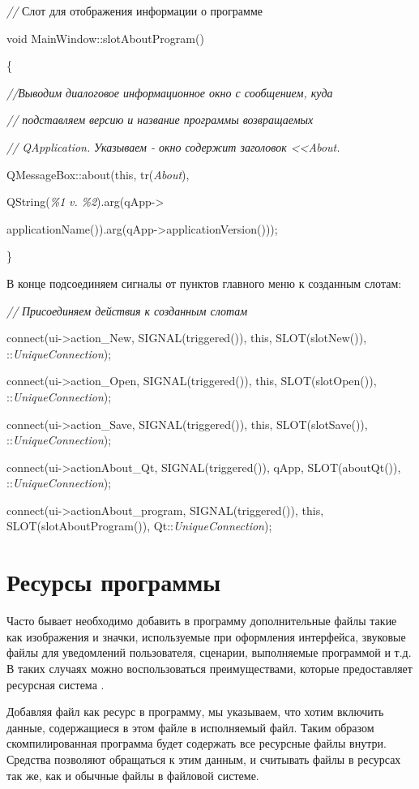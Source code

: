 \textit{// }Слот для отображения информации о программе 

void MainWindow::slotAboutProgram()

\{

\textit{//}\textit{Выводим диалоговое информационное окно с сообщением, куда}

\textit{// подставляем}\textit{ } \textit{версию и название программы возвращаемых}

\textit{// QApplication}\textit{.} \textit{Указываем - окно содержит заголовок <<About.}

QMessageBox::about(this, tr(\textit{About}), 

QString(\textit{\%1} \textit{v.} \textit{\%2}).arg(qApp-{>}

applicationName()).arg(qApp-{>}applicationVersion()));

\}

В конце подсоединяем сигналы от пунктов главного меню к созданным слотам: 

\textit{//} \textit{Присоединяем действия к созданным слотам}

connect(ui-{>}action\_New, SIGNAL(triggered()), this, SLOT(slotNew()), ::\textit{UniqueConnection});

connect(ui-{>}action\_Open, SIGNAL(triggered()), this, SLOT(slotOpen()), ::\textit{UniqueConnection});

connect(ui-{>}action\_Save, SIGNAL(triggered()), this, SLOT(slotSave()), ::\textit{UniqueConnection});

connect(ui-{>}actionAbout\_Qt, SIGNAL(triggered()),  qApp, SLOT(aboutQt()), ::\textit{UniqueConnection});

connect(ui-{>}actionAbout\_program, SIGNAL(triggered()),  this, SLOT(slotAboutProgram()),
Qt::\textit{UniqueConnection});

\section[\ Ресурсы программы]{ Ресурсы программы}
Часто бывает необходимо добавить в программу дополнительные файлы такие как изображения и значки, используемые при
оформления интерфейса, звуковые файлы для уведомлений пользователя, сценарии, выполняемые программой и т.д. В таких
случаях можно воспользоваться преимуществами, которые предоставляет ресурсная система . 

Добавляя файл как ресурс в программу, мы указываем, что хотим включить данные, содержащиеся в этом файле
в исполняемый файл. Таким образом скомпилированная программа будет содержать все ресурсные файлы внутри. Средства 
позволяют обращаться к этим данным, и считывать файлы в ресурсах так же, как и обычные файлы в файловой системе. 

